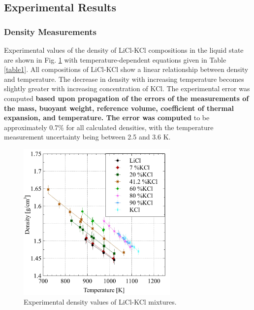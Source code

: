 \documentclass[review]{elsarticle}
\providecommand{\DIFaddtex}[1]{{\bf #1}} %
\providecommand{\DIFaddbegin}{\protect\color{blue}} %
\providecommand{\DIFaddend}{\protect\color{black}} %
\providecommand{\DIFaddbeginFL}{} %
\providecommand{\DIFaddendFL}{} %
\providecommand{\DIFdelbeginFL}{} %
\providecommand{\DIFdelendFL}{} %
\providecommand{\DIFadd}[1]{\texorpdfstring{\DIFaddtex{#1}}{#1}} %
\newcommand{\DIFscaledelfig}{0.5}
\newlength{\DIFdelgraphicswidth} %
\newlength{\DIFdelgraphicsheight} %
\newcommand{\DIFaddincludegraphics}[2][]{{\color{blue}\fbox{\DIFOincludegraphics[#1]{#2}}}} %
\newcommand{\DIFdelincludegraphics}[2][]{%
\sbox{\DIFdelgraphicsbox}{\DIFOincludegraphics[#1]{#2}}%
\settoboxwidth{\DIFdelgraphicswidth}{\DIFdelgraphicsbox} %
\settoboxtotalheight{\DIFdelgraphicsheight}{\DIFdelgraphicsbox} %
\scalebox{\DIFscaledelfig}{%
\parbox[b]{\DIFdelgraphicswidth}{\usebox{\DIFdelgraphicsbox}\\[-\baselineskip] \rule{\DIFdelgraphicswidth}{0em}}\llap{\resizebox{\DIFdelgraphicswidth}{\DIFdelgraphicsheight}{%
\setlength{\unitlength}{\DIFdelgraphicswidth}%
\begin{picture}(1,1)%
\thicklines\linethickness{2pt} %
{\color[rgb]{1,0,0}\put(0,0){\framebox(1,1){}}}%
{\color[rgb]{1,0,0}\put(0,0){\line( 1,1){1}}}%
{\color[rgb]{1,0,0}\put(0,1){\line(1,-1){1}}}%
\end{picture}%
}\hspace*{3pt}}} %
} %
\DeclareRobustCommand{\DIFaddbegin}{\DIFOaddbegin \let\includegraphics\DIFaddincludegraphics} %
\DeclareRobustCommand{\DIFaddend}{\DIFOaddend \let\includegraphics\DIFOincludegraphics} %
\DeclareRobustCommand{\DIFaddbeginFL}{\DIFOaddbeginFL \let\includegraphics\DIFaddincludegraphics} %
\DeclareRobustCommand{\DIFaddendFL}{\DIFOaddendFL \let\includegraphics\DIFOincludegraphics} %
\DeclareRobustCommand{\DIFdelbeginFL}{\DIFOdelbeginFL \let\includegraphics\DIFdelincludegraphics} %
\DeclareRobustCommand{\DIFdelendFL}{\DIFOaddendFL \let\includegraphics\DIFOincludegraphics} %
\begin{document}
\FloatBarrier

\subsection{Experimental Results}

\DIFaddbegin \subsubsection{\DIFadd{Density Measurements}}

\DIFaddend Experimental values of the density of LiCl-KCl compositions in the liquid state are shown in Fig. \ref{fig:density_exp} with temperature-dependent equations given in Table \ref{table1}. All compositions of LiCl-KCl show a linear relationship between density and temperature. The decrease in density with increasing temperature becomes slightly greater with increasing concentration of KCl. The experimental error was computed \DIFaddbegin \DIFadd{based upon propagation of the errors of the measurements of the mass, buoyant weight, reference volume, coefficient of thermal expansion, and temperature. The error was computed }\DIFaddend to be approximately 0.7\% for all calculated densities, with the temperature measurement uncertainty being between 2.5 and 3.6 K. 

\begin{figure}[h]
 \centering
 \DIFdelbeginFL %
\DIFdelendFL \DIFaddbeginFL \includegraphics[width=0.7\textwidth]{images/density_exp.jpg} 
 \DIFaddendFL \caption{Experimental density values of LiCl-KCl mixtures.}
 \label{fig:density_exp}
\end{figure} 
\end{document}
